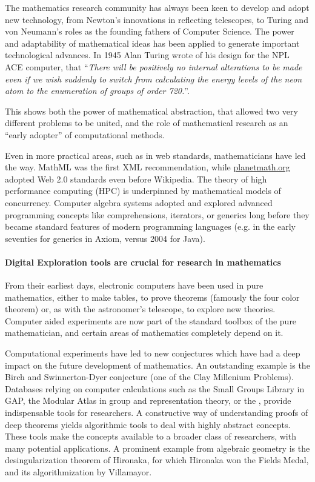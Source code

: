 The mathematics research community has always been keen to develop and
adopt new technology, from Newton's innovations in reflecting
telescopes, to Turing and von Neumann's roles as the founding fathers
of Computer Science. The power and adaptability of mathematical ideas
has been applied to generate important technological advances.  In
1945 Alan Turing wrote of his design for the NPL ACE computer, that
``\emph{There will be positively no internal alterations to be made
  even if we wish suddenly to switch from calculating the energy
  levels of the neon atom to the enumeration of groups of order
  720.}''.

This shows both the power of mathematical abstraction, that allowed
two very different problems to be united, and the role of mathematical
research as an ``early adopter'' of computational methods.

Even in more practical areas, such as in web standards, mathematicians
have led the way. MathML was the first XML recommendation, while
\url{planetmath.org} adopted Web 2.0 standards even before
Wikipedia. The theory of high performance computing (HPC) is
underpinned by mathematical models of concurrency. Computer algebra
systems adopted and explored advanced programming concepts like
comprehensions, iterators, or generics long before they became
standard features of modern programming languages (e.g. in the early
seventies for generics in Axiom, versus 2004 for Java).



\paragraph{Digital Exploration tools are crucial for research in mathematics}

From their earliest days, electronic computers have been used in pure
mathematics, either to make tables, to prove theorems (famously the
four color theorem) or, as with the astronomer's telescope, to explore
new theories. Computer aided experiments are now part of the standard
toolbox of the pure mathematician, and certain areas of mathematics
completely depend on it.

Computational experiments have led to new conjectures which have had a
deep impact on the future development of mathematics. An outstanding
example is the Birch and Swinnerton-Dyer conjecture (one of the Clay
Millenium Problems).  Databases relying on computer calculations such
as the Small Groups Library in GAP, the Modular Atlas in group and
representation theory, or the \LMFDB, provide indispensable tools for
researchers. A constructive way of understanding proofs of deep
theorems yields algorithmic tools to deal with highly abstract
concepts. These tools make the concepts available to a broader class
of researchers, with many potential applications. A prominent example
from algebraic geometry is the desingularization theorem of Hironaka,
for which Hironaka won the Fields Medal, and its algorithmization by
Villamayor.

